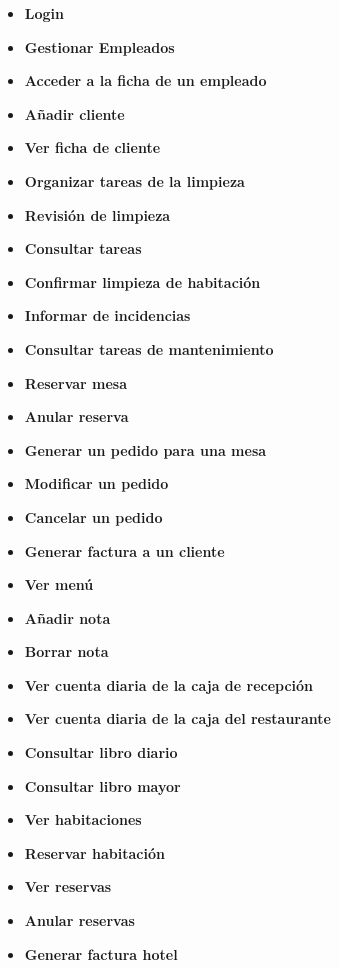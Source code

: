 \documentclass[spanish,a4paper,12pt]{report}		%
\begin{document}
	\begin{itemize}
	\item \textbf{Login}	
	\item \textbf{Gestionar Empleados}	
	\item \textbf{Acceder a la ficha de un empleado}
	\item \textbf{Añadir cliente}
	\item \textbf{Ver ficha de cliente}
	\item \textbf{Organizar tareas de la limpieza}
	\item \textbf{Revisión de limpieza}
	\item \textbf{Consultar tareas}
	\item \textbf{Confirmar limpieza de habitación}
	\item \textbf{Informar de incidencias}	
	\item \textbf{Consultar tareas de  mantenimiento}
	\item \textbf{Reservar mesa}
	\item \textbf{Anular reserva}
	\item \textbf{Generar un pedido para una mesa}
	\item \textbf{Modificar un pedido}
	\item \textbf{Cancelar un pedido}
	\item \textbf{Generar factura a un cliente}
	\item \textbf{Ver menú}
	\item \textbf{Añadir nota}
	\item \textbf{Borrar nota}
	\item \textbf{Ver cuenta diaria de la caja de recepción}
	\item \textbf{Ver cuenta diaria de la caja del restaurante}
	\item \textbf{Consultar libro diario}
	\item \textbf{Consultar libro mayor}
	\item \textbf{Ver habitaciones}	
	\item \textbf{Reservar habitación}
	\item \textbf{Ver reservas}
	\item \textbf{Anular reservas}
	\item \textbf{Generar factura hotel}
	
	\end{itemize}
\end{document}
